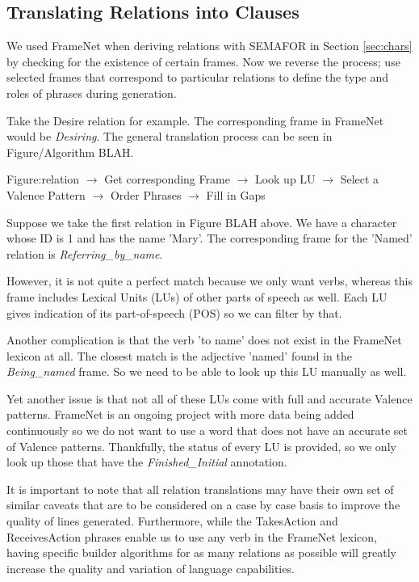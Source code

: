 \subsection{Translating Relations into Clauses}
We used FrameNet when deriving relations with SEMAFOR in Section \ref{sec:chars} by checking for the existence of certain frames. Now we reverse the process; use selected frames that correspond to particular relations to define the type and roles of phrases during generation.

Take the Desire relation for example. The corresponding frame in FrameNet would be \textit{Desiring}. The general translation process can be seen in Figure/Algorithm BLAH.

Figure:relation $\rightarrow$ Get corresponding Frame $\rightarrow$ Look up LU $\rightarrow$ Select a Valence Pattern $\rightarrow$ Order Phrases $\rightarrow$ Fill in Gaps

Suppose we take the first relation in Figure BLAH above. We have a character whose ID is 1 and has the name 'Mary'. The corresponding frame for the 'Named' relation is \textit{Referring\_by\_name}. 

However, it is not quite a perfect match because we only want verbs, whereas this frame includes Lexical Units (LUs) of other parts of speech as well. Each LU gives indication of its part-of-speech (POS) so we can filter by that. 

Another complication is that the verb 'to name' does not exist in the FrameNet lexicon at all. The closest match is the adjective 'named' found in the \textit{Being\_named} frame. So we need to be able to look up this LU manually as well.

Yet another issue is that not all of these LUs come with full and accurate Valence patterns. FrameNet is an ongoing project with more data being added continuously so we do not want to use a word that does not have an accurate set of Valence patterns. Thankfully, the status of every LU is provided, so we only look up those that have the \textit{Finished\_Initial} annotation.

It is important to note that all relation translations may have their own set of similar caveats that are to be considered on a case by case basis to improve the quality of lines generated. Furthermore, while the TakesAction and ReceivesAction phrases enable us to use any verb in the FrameNet lexicon, having specific builder algorithms for as many relations as possible will greatly increase the quality and variation of language capabilities.

